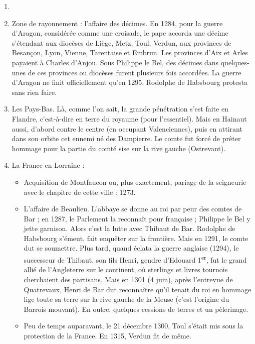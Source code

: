 \documentclass[french,twoside]{book} %
\begin{document}
\begin{enumerate}[itemsep=\baselineskip,]
\item[] \hspace{-1.5em}{\bfseries Ici, il faut de toute nécessité sérier géographiquement :}
\item Zone de rayonnement : l’affaire des décimes. En 1284, pour la guerre d’Aragon, considérée comme une croisade, le pape accorda une décime s’étendant aux diocèses de Liège, Metz, Toul, Verdun, aux provinces de Besançon, Lyon, Vienne, Tarentaise et Embrun. Les provinces d’Aix et Arles payaient à Charles d’Anjou. Sous Philippe le Bel, des décimes dans quelques-unes de ces provinces ou diocèses furent plusieurs fois accordées. La guerre d’Aragon ne finit officiellement qu’en 1295. Rodolphe de Habsbourg protesta sans rien faire.
\item Les Pays-Bas. Là, comme l’on sait, la grande pénétration s’est faite en Flandre, c’est-à-dire en terre du royaume (pour l’essentiel). Mais en Hainaut aussi, d’abord contre le centre (en occupant Valenciennes), puis en attirant dans son orbite cet ennemi né des Dampierre. Le comte fut forcé de prêter hommage pour la partie du comté sise sur la rive gauche (Ostrevant).
\item La France en Lorraine : 
\begin{itemize}[itemsep=0pt,]
\item Acquisition de Montfaucon ou, plus exactement, pariage de la seigneurie avec le chapitre de cette ville : 1273.
\item L’affaire de Beaulieu. L’abbaye se donne au roi par peur des comtes de Bar ; en 1287, le Parlement la reconnaît pour française ; Philippe le Bel y jette garnison. Alors c’est la lutte avec Thibaut de Bar. Rodolphe de Habsbourg s’émeut, fait enquêter sur la frontière. Mais en 1291, le comte dut se soumettre. Plus tard, quand éclata la guerre anglaise (1294), le successeur de Thibaut,  
\label{p34} son fils Henri, gendre d’Edouard 1\textsuperscript{er}, fut le grand allié de l’Angleterre sur le continent, où sterlings et livres tournois cherchaient des partisans. Mais en 1301 (4 juin), après l’entrevue de Quatrevaux, Henri de Bar dut reconnaître qu’il tenait du roi en hommage lige toute sa terre sur la rive gauche de la Meuse (c’est l’origine du Barrois mouvant). En outre, quelques cessions de terres et un pèlerinage.
\item Peu de temps auparavant, le 21 décembre 1300, Toul s’était mis sous la protection de la France. En 1315, Verdun fit de même.
\end{itemize}
 

\end{enumerate}
\end{document}
